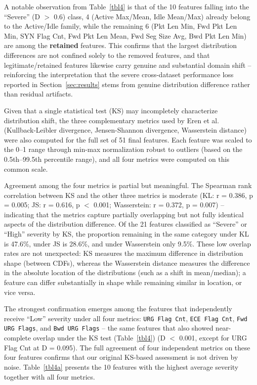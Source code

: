 \documentclass[a4paper,fleqn]{cas-sc}
\begin{document}
A notable observation from Table~\ref{tbl4} is that of the 10 features falling into the ``Severe'' (D $>$ 0.6) class, 4 (Active Max/Mean, Idle Mean/Max) already belong to the Active/Idle family, while the remaining 6 (Pkt Len Min, Fwd Pkt Len Min, SYN Flag Cnt, Fwd Pkt Len Mean, Fwd Seg Size Avg, Bwd Pkt Len Min) are among the \textbf{retained} features. This confirms that the largest distribution differences are not confined solely to the removed features, and that legitimate/retained features likewise carry genuine and substantial domain shift -- reinforcing the interpretation that the severe cross-dataset performance loss reported in Section~\ref{sec:results} stems from genuine distribution difference rather than residual artifacts.

Given that a single statistical test (KS) may incompletely characterize distribution shift, the three complementary metrics used by Eren et al.~\cite{Eren2026} (Kullback-Leibler divergence, Jensen-Shannon divergence, Wasserstein distance) were also computed for the full set of 51 final features. Each feature was scaled to the 0--1 range through min-max normalization robust to outliers (based on the 0.5th--99.5th percentile range), and all four metrics were computed on this common scale.

Agreement among the four metrics is partial but meaningful. The Spearman rank correlation between KS and the other three metrics is moderate (KL: r = 0.386, p = 0.005; JS: r = 0.616, p $<$ 0.001; Wasserstein: r = 0.372, p = 0.007) -- indicating that the metrics capture partially overlapping but not fully identical aspects of the distribution difference. Of the 21 features classified as ``Severe'' or ``High'' severity by KS, the proportion remaining in the same category under KL is 47.6\%, under JS is 28.6\%, and under Wasserstein only 9.5\%. These low overlap rates are not unexpected: KS measures the maximum difference in distribution shape (between CDFs), whereas the Wasserstein distance measures the difference in the absolute location of the distributions (such as a shift in mean/median); a feature can differ substantially in shape while remaining similar in location, or vice versa.

The strongest confirmation emerges among the features that independently receive ``Low'' severity under all four metrics: \texttt{URG Flag Cnt}, \texttt{ECE Flag Cnt}, \texttt{Fwd URG Flags}, and \texttt{Bwd URG Flags} -- the same features that also showed near-complete overlap under the KS test (Table~\ref{tbl4}) (D $<$ 0.001, except for URG Flag Cnt at D = 0.095). The full agreement of four independent metrics on these four features confirms that our original KS-based assessment is not driven by noise. Table~\ref{tbl4a} presents the 10 features with the highest average severity together with all four metrics.
\end{document}
